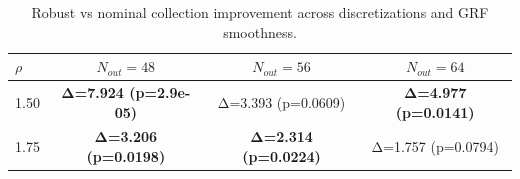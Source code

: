 \begin{table}[h]
\centering
\small
\begin{tabular}{l|ccc}
\toprule
$\rho$ & $N_{out}=48$ & $N_{out}=56$ & $N_{out}=64$ \\ \midrule
1.50 & \textbf{Δ=7.924 (p=2.9e-05)} & Δ=3.393 (p=0.0609) & \textbf{Δ=4.977 (p=0.0141)} \\
1.75 & \textbf{Δ=3.206 (p=0.0198)} & \textbf{Δ=2.314 (p=0.0224)} & Δ=1.757 (p=0.0794) \\
\bottomrule
\end{tabular}
\caption{Robust vs nominal collection improvement across discretizations and GRF smoothness.}
\label{tab:collection_sweep}
\end{table}